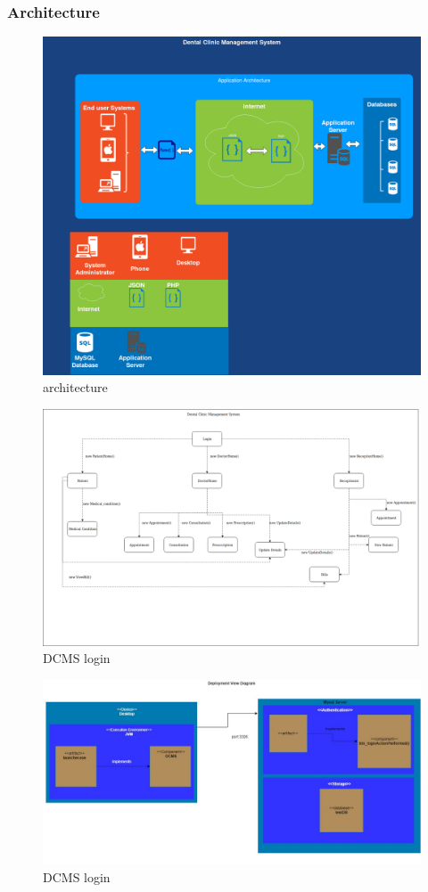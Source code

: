 \documentclass[11 pt]{article}
\begin{document}
\subsubsection{Architecture}
\begin{figure}[h]
\centering
\includegraphics[width=1.2\linewidth]{architecture.png}
\caption{architecture}
\end{figure}
\begin{figure}[h]
\includegraphics[width=1.2\linewidth, left]{Logical_view.png}
\caption{DCMS login}
\label{fig:login}
\end{figure}
\begin{figure}[h]
\includegraphics[width=1.2\linewidth, left]{deployment_view_diagram.png}
\caption{DCMS login}
\label{fig:login}
\end{figure}
\newpage
\end{document}
